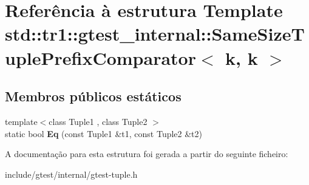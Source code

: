 \hypertarget{structstd_1_1tr1_1_1gtest__internal_1_1SameSizeTuplePrefixComparator_3_01k_00_01k_01_4}{\section{Referência à estrutura Template std\-:\-:tr1\-:\-:gtest\-\_\-internal\-:\-:Same\-Size\-Tuple\-Prefix\-Comparator$<$ k, k $>$}
\label{structstd_1_1tr1_1_1gtest__internal_1_1SameSizeTuplePrefixComparator_3_01k_00_01k_01_4}
}
\subsection*{Membros públicos estáticos}
\begin{DoxyCompactItemize}
\item 
\hypertarget{structstd_1_1tr1_1_1gtest__internal_1_1SameSizeTuplePrefixComparator_3_01k_00_01k_01_4_a5564fbade05a2d0522d9899da62c2119}{{\footnotesize template$<$class Tuple1 , class Tuple2 $>$ }\\static bool {\bfseries Eq} (const Tuple1 \&t1, const Tuple2 \&t2)}\label{structstd_1_1tr1_1_1gtest__internal_1_1SameSizeTuplePrefixComparator_3_01k_00_01k_01_4_a5564fbade05a2d0522d9899da62c2119}

\end{DoxyCompactItemize}


A documentação para esta estrutura foi gerada a partir do seguinte ficheiro\-:\begin{DoxyCompactItemize}
\item 
include/gtest/internal/gtest-\/tuple.\-h\end{DoxyCompactItemize}
